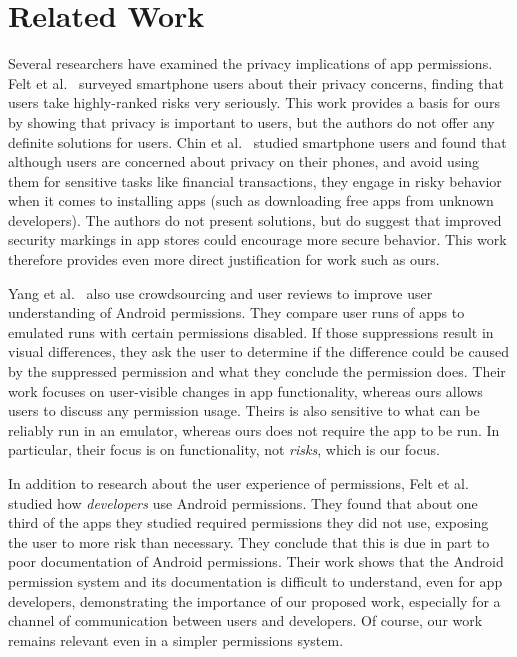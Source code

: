 \documentclass[11pt]{article}
\begin{document}
\section{Related Work}

Several researchers have examined the privacy implications of app permissions. 
Felt et al.\ \cite{99-problems-SPSM12} surveyed smartphone users about their 
privacy concerns, finding that users take highly-ranked risks very seriously. 
This work provides a basis for ours by showing that privacy is important to
users, but the authors do not offer any definite solutions for users. Chin 
et al.\ \cite{smartphone-user-conf-SOUPS12} studied smartphone users and found 
that although users are concerned about privacy on their phones, and avoid 
using them for sensitive tasks like financial transactions, they engage 
in risky behavior when it comes to installing apps (such as 
downloading free apps from unknown developers). The authors do not present 
solutions, but do suggest that improved security markings in app stores could 
encourage more secure behavior. This work therefore provides even more
direct justification for work such as ours.

Yang et al.\ \cite{droidganger-SPSM12} also use crowdsourcing and user
reviews to improve user understanding of Android permissions. They
compare user runs of apps to emulated runs with certain permissions
disabled. If those suppressions result in visual differences, they ask
the user to determine if the difference could be caused by the
suppressed permission and what they conclude the permission
does. Their work focuses on user-visible changes in app
functionality, whereas ours allows users to discuss any permission
usage. Theirs is also sensitive to what can be reliably run in an
emulator, whereas ours does not require the app to be run.  In
particular, their focus is on functionality, not \emph{risks}, which
is our focus.

In addition to research about the user experience of permissions, Felt
et al.\ \cite{perms-demystified-CCS11} studied how \emph{developers}
use Android permissions.  They found that about one third of the apps
they studied required permissions they did not use, exposing the user
to more risk than necessary. They conclude that this is due in part to
poor documentation of Android permissions. Their work shows that the
Android permission system and its documentation is difficult to
understand, even for app developers, demonstrating the importance of
our proposed work, especially for a channel of communication between
users and developers. Of course, our work remains relevant even in a
simpler permissions system.
\end{document}
